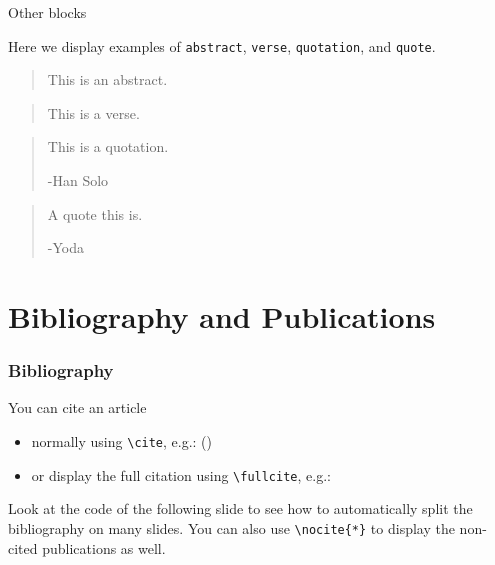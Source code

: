 \documentclass[usenames,dvipsnames]{beamer}
\begin{document}
\begin{frame}{Other blocks}

Here we display examples of \texttt{abstract}, \texttt{verse}, \texttt{quotation}, and \texttt{quote}.

\vskip 0.5cm

\begin{abstract}
This is an abstract.
\end{abstract}
\begin{verse}
This is a verse.
\end{verse}
\begin{quotation}
This is a quotation.

\raggedleft -Han Solo
\end{quotation}
\begin{quote}
A quote this is.

\raggedleft -Yoda
\end{quote}

\end{frame}

\section{Bibliography and Publications}
\begin{frame}[fragile]
\frametitle{Bibliography}

You can cite an article
\begin{itemize}
\item normally using \texttt{\textbackslash cite}, e.g.: (\cite{article1})
\item or display the full citation using \texttt{\textbackslash fullcite}, e.g.:  
\end{itemize}

\vskip 0.5cm
Look at the code of the following slide to see how to automatically split the bibliography on many slides. You can also use \texttt{\textbackslash nocite\{*\}} to display the non-cited publications as well.

\end{frame}




\end{document}
